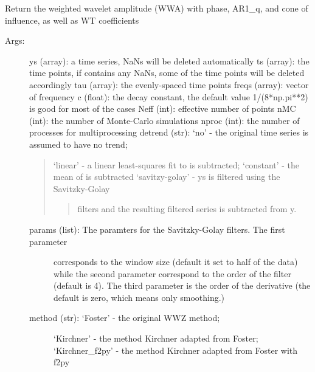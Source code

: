 \documentclass[letterpaper,10pt,english]{sphinxmanual}
\begin{document}
\begin{fulllineitems}
\label{\detokenize{Spectral:pyleoclim.Spectral.wwz}}
Return the weighted wavelet amplitude (WWA) with phase, AR1\_q, and cone of influence, as well as WT coefficients
\begin{description}
\item[{Args:}] \leavevmode
ys (array): a time series, NaNs will be deleted automatically
ts (array): the time points, if  contains any NaNs, some of the time points will be deleted accordingly
tau (array): the evenly-spaced time points
freqs (array): vector of frequency
c (float): the decay constant, the default value 1/(8*np.pi**2) is good for most of the cases
Neff (int): effective number of points
nMC (int): the number of Monte-Carlo simulations
nproc (int): the number of processes for multiprocessing
detrend (str): ‘no’ - the original time series is assumed to have no trend;
\begin{quote}

‘linear’ - a linear least-squares fit to  is subtracted;
‘constant’ - the mean of  is subtracted
‘savitzy-golay’ - ys is filtered using the Savitzky-Golay
\begin{quote}

filters and the resulting filtered series is subtracted from y.
\end{quote}
\end{quote}
\begin{description}
\item[{params (list): The paramters for the Savitzky-Golay filters. The first parameter}] \leavevmode
corresponds to the window size (default it set to half of the data)
while the second parameter correspond to the order of the filter
(default is 4). The third parameter is the order of the derivative
(the default is zero, which means only smoothing.)

\item[{method (str): ‘Foster’ - the original WWZ method;}] \leavevmode
‘Kirchner’ - the method Kirchner adapted from Foster;
‘Kirchner\_f2py’ - the method Kirchner adapted from Foster with f2py


\end{description}
\end{description}
\end{fulllineitems}
\end{document}
